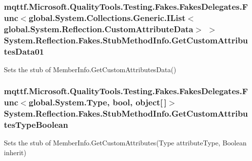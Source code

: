 \hypertarget{class_system_1_1_reflection_1_1_fakes_1_1_stub_method_info_a505288d8d68f6ce94e6eaca62b97f98f}{
\subsubsection[{Get\-Custom\-Attributes\-Data01}]{\setlength{\rightskip}{0pt plus 5cm}mqttf.\-Microsoft.\-Quality\-Tools.\-Testing.\-Fakes.\-Fakes\-Delegates.\-Func$<$global.\-System.\-Collections.\-Generic.\-I\-List$<$global.\-System.\-Reflection.\-Custom\-Attribute\-Data$>$ $>$ System.\-Reflection.\-Fakes.\-Stub\-Method\-Info.\-Get\-Custom\-Attributes\-Data01}}\label{class_system_1_1_reflection_1_1_fakes_1_1_stub_method_info_a505288d8d68f6ce94e6eaca62b97f98f}


Sets the stub of Member\-Info.\-Get\-Custom\-Attributes\-Data()

\hypertarget{class_system_1_1_reflection_1_1_fakes_1_1_stub_method_info_a8a6b02076fdb7fec2f443f501afbc722}{
\subsubsection[{Get\-Custom\-Attributes\-Type\-Boolean}]{\setlength{\rightskip}{0pt plus 5cm}mqttf.\-Microsoft.\-Quality\-Tools.\-Testing.\-Fakes.\-Fakes\-Delegates.\-Func$<$global.\-System.\-Type, bool, object\mbox{[}$\,$\mbox{]}$>$ System.\-Reflection.\-Fakes.\-Stub\-Method\-Info.\-Get\-Custom\-Attributes\-Type\-Boolean}}\label{class_system_1_1_reflection_1_1_fakes_1_1_stub_method_info_a8a6b02076fdb7fec2f443f501afbc722}


Sets the stub of Member\-Info.\-Get\-Custom\-Attributes(\-Type attribute\-Type, Boolean inherit)

